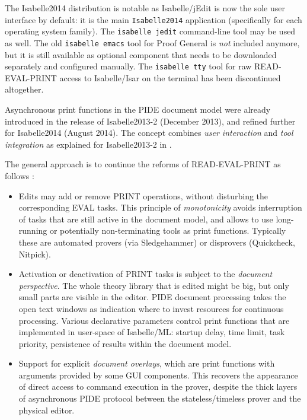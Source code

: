 \begin{isabellebody}
\begin{isamarkuptext}
The Isabelle2014 distribution is notable as Isabelle/jEdit is now the sole
user interface by default: it is the main \verb|Isabelle2014|
application (specifically for each operating system family). The \verb|isabelle jedit| command-line tool may be used as well. The old \verb|isabelle emacs| tool for Proof General is \emph{not} included anymore, but
it is still available as optional component that needs to be downloaded
separately and configured manually. The \verb|isabelle tty| tool for
raw READ-EVAL-PRINT access to Isabelle/Isar on the terminal has been
discontinued altogether.\end{isamarkuptext}\isamarkuptrue {}
\isamarkuptrue \begin{isamarkuptext}Asynchronous print functions in the PIDE document model were already
introduced in the release of Isabelle2013-2 (December 2013), and refined
further for Isabelle2014 (August 2014). The concept combines \emph{user
interaction} and \emph{tool integration} as explained for Isabelle2013-2 in
\cite{Wenzel:2014:ITP-PIDE}.

The general approach is to continue the reforms of READ-EVAL-PRINT
\cite{Wenzel:2012:UITP-EPTCS} as follows \cite[\S5]{Wenzel:2014:ITP-PIDE}:

\begin{itemize}

\item Edits may add or remove PRINT operations, without disturbing the
corresponding EVAL tasks. This principle of \emph{monotonicity} avoids
interruption of tasks that are still active in the document model, and
allows to use long-running or potentially non-terminating tools as print
functions. Typically these are automated provers (via Sledgehammer) or
disprovers (Quickcheck, Nitpick).

\item Activation or deactivation of PRINT tasks is subject to the
\emph{document perspective}. The whole theory library that is edited might
be big, but only small parts are visible in the editor. PIDE document
processing takes the open text windows as indication where to invest
resources for continuous processing. Various declarative parameters control
print functions that are implemented in user-space of Isabelle/ML: startup
delay, time limit, task priority, persistence of results within the document
model.

\item Support for explicit \emph{document overlays}, which are print
functions with arguments provided by some GUI components. This recovers the
appearance of direct access to command execution in the prover, despite the
thick layers of asynchronous PIDE protocol between the stateless/timeless
prover and the physical editor.


\end{itemize}
\end{isamarkuptext}
\end{isabellebody}
